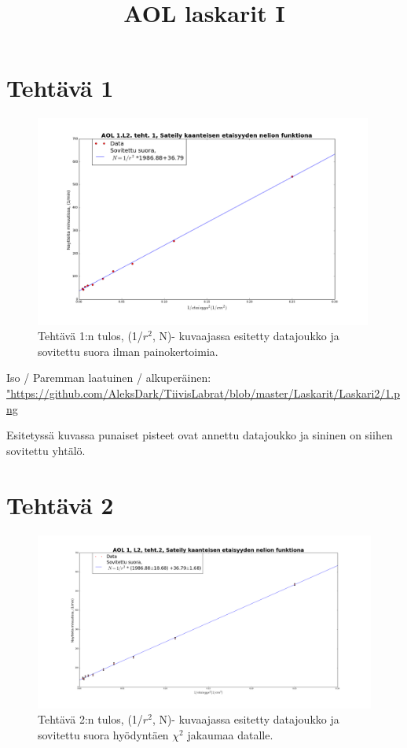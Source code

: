 \documentclass[a4paper, 12pt]{article}
\title{AOL laskarit I}
\begin{document}
\renewcommand{\headrulewidth}{0pt}
\setlength{\headheight}{25pt}
\pagestyle{fancy}

\section*{Tehtävä 1}
\begin{figure}
\includegraphics[width=0.99\textwidth]{1}
\caption{Tehtävä 1:n tulos, (1/$r^2$, N)- kuvaajassa esitetty datajoukko ja sovitettu suora ilman painokertoimia.}
\end{figure}

Iso / Paremman laatuinen / alkuperäinen: \url{"https://github.com/AleksDark/TiivisLabrat/blob/master/Laskarit/Laskari2/1.png}

Esitetyssä kuvassa punaiset pisteet ovat annettu datajoukko ja  sininen on siihen sovitettu yhtälö.

\section*{Tehtävä 2}
\begin{figure}
\includegraphics[width=1\textwidth]{2}
\caption{Tehtävä 2:n tulos, (1/$r^2$, N)- kuvaajassa esitetty datajoukko ja sovitettu suora hyödyntäen $\chi^2$ jakaumaa datalle.}
\end{figure}
\end{document}

